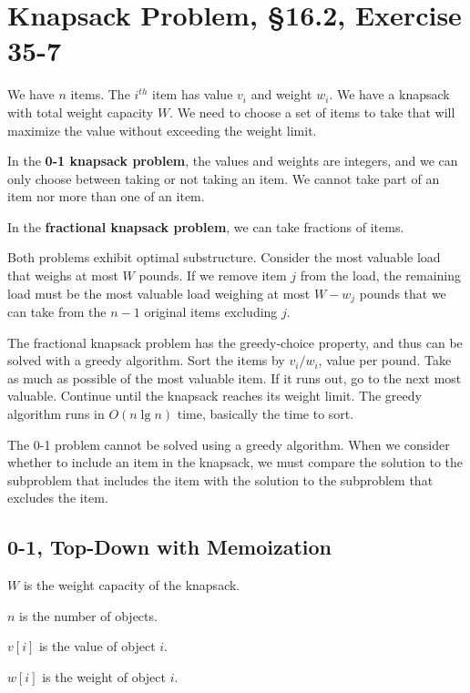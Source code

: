 \section{Knapsack Problem, \S 16.2, Exercise 35-7}

We have $n$ items.  The $i^{th}$ item has value $v_i$ and weight $w_i$.  We have a knapsack with total weight capacity $W$.  We need to choose a set of items to take that will maximize the value without exceeding the weight limit.  

In the {\bf 0-1 knapsack problem}, the values and weights are integers, and we can only choose between taking or not taking an item.  We cannot take part of an item nor more than one of an item.  

In the {\bf fractional knapsack problem}, we can take fractions of items.  

Both problems exhibit optimal substructure.  Consider the most valuable load that weighs at most $W$ pounds.  If we remove item $j$ from the load, the remaining load must be the most valuable load weighing at most $W-w_j$ pounds that we can take from the $n-1$ original items excluding $j$.  

The fractional knapsack problem has the greedy-choice property, and thus can be solved with a greedy algorithm.  Sort the items by $v_i/w_i$, value per pound.  Take as much as possible of the most valuable item.  If it runs out, go to the next most valuable.  Continue until the knapsack reaches its weight limit.  The greedy algorithm runs in $O(n \lg n)$ time, basically the time to sort.  

The 0-1 problem cannot be solved using a greedy algorithm.  When we consider whether to include an item in the knapsack, we must compare the solution to the subproblem that includes the item with the solution to the subproblem that excludes the item.  

\subsection{0-1, Top-Down with Memoization}

$W$ is the weight capacity of the knapsack.

$n$ is the number of objects.

$v[i]$ is the value of object $i$.

$w[i]$ is the weight of object $i$.  




